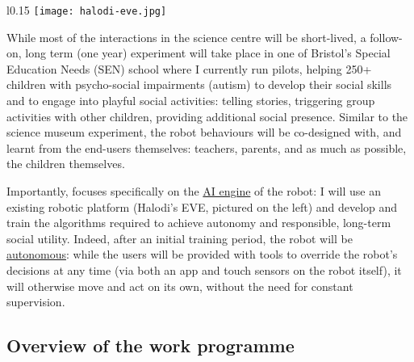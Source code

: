 \begin{wrapfigure}[11]{l}{0.15\linewidth}
    \centering
    \vspace{-10pt}
    \texttt{[image: halodi-eve.jpg]}
    \label{fig|EVE}
\end{wrapfigure}

While most of the interactions in the science centre will be short-lived, a
follow-on, long term (one year) experiment will take place in one of Bristol's
Special Education Needs (SEN) school where I currently run pilots, helping 250+
children with psycho-social impairments (autism) to develop their social skills
and to engage into playful social activities: telling stories, triggering group
activities with other children, providing additional social presence. Similar to
the science museum experiment, the robot behaviours will be co-designed with,
and learnt from the end-users themselves: teachers, parents, and as much as possible,
the children themselves.


Importantly, \project focuses specifically on the \ul{AI engine} of the robot: I
will use an existing robotic platform (Halodi's EVE, pictured on the left) and
develop and train the algorithms required to achieve autonomy and responsible,
long-term social utility. Indeed, after an initial training period, the robot
will be \ul{autonomous}: while the users will be provided with tools to override
the robot's decisions at any time (via both an app and touch sensors on the robot
itself), it will otherwise move and act on its own, without the need for
constant supervision.



\subsection{Overview of the work programme}


